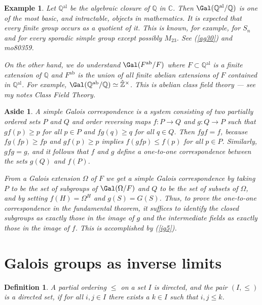 \documentclass[a4paper,11pt,final,openany]{memoir}
\newtheorem{definition}[X]{Definition}
\newtheorem{example}[X]{Example}
\newtheorem{aside}[X]{Aside}
\theoremstyle{nonumberplain}
\begin{document}
\begin{example}
\label{ig11}Let $\mathbb{Q}{}^{\mathrm{al}}$ be the algebraic closure of
$\mathbb{Q}$ in $\mathbb{C}$. Then $\Gal(\mathbb{Q}{}^{\mathrm{al}}%
/\mathbb{Q})$ is one of the most basic, and intractable, objects in
mathematics. It is expected that \textit{every}\emph{\/} finite group occurs
as a quotient of it. This is known, for example, for $S_{n}$ and for every
sporadic simple group except possibly $M_{23}$. See (\ref{ag30}) and mo80359.

On the other hand, we do understand $\Gal(F^{\text{ab}}/F)$ where
$F\subset\mathbb{Q}{}^{\mathrm{al}}$ is a finite extension of $\mathbb{Q}$ and
$F$$^{\text{{a}{b}}}$ is the union of all finite abelian extensions of $F$
contained in $\mathbb{Q}{}^{\mathrm{al}}$. For example, $\Gal(\mathbb{Q}%
^{\text{ab}}/\mathbb{Q})\simeq\hat{\mathbb{Z}}^{\times}$. This is abelian
class field theory --- see my notes Class Field Theory\textit{.}
\end{example}

\begin{aside}
\label{ig11a}A%
\emph{simple Galois correspondence }is a system consisting of two partially
ordered sets $P$ and $Q$ and order reversing maps $f\colon P\rightarrow Q$ and
$g\colon Q\rightarrow P$ such that $gf(p)\geq p$ for all $p\in P$ and
$fg(q)\geq q$ for all $q\in Q$. Then $fgf=f$, because $fg(fp)\geq fp$ and
$gf(p)\geq p$ implies $f(gfp)\leq f(p)$ for all $p\in P$. Similarly, $gfg=g$,
and it follows that $f$ and $g$ define a one-to-one correspondence between the
sets $g(Q)$ and $f(P)$.

From a Galois extension $\Omega$ of $F$ we get a simple Galois correspondence
by taking $P$ to be the set of subgroups of $\Gal(\Omega/F)$ and $Q$ to be the
set of subsets of $\Omega$, and by setting $f(H)=\Omega^{H}$ and $g(S)=G(S)$.
Thus, to prove the one-to-one correspondence in the fundamental theorem, it
suffices to identify the closed subgroups as exactly those in the image of $g$
and the intermediate fields as exactly those in the image of $f$. This is
accomplished by (\ref{ig5}).
\end{aside}

\section{Galois groups as inverse limits}

\begin{definition}
\label{ig12}A partial ordering $\leq$ on a set $I$ is
\emph{directed}, and the pair $(I,\leq)$ is a \emph{directed set}, if for all
$i,j\in I$ there exists a $k\in I$ such that $i,j\leq k$.
\end{definition}
\end{document}
